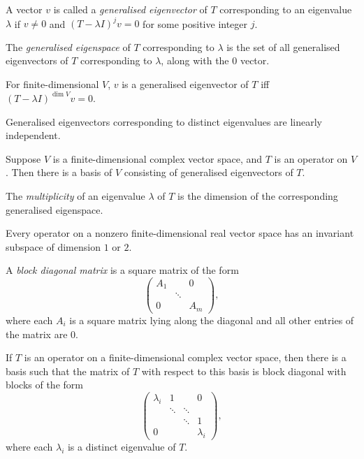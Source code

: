 \begin{defn}
  A vector $v$ is called a \emph{generalised eigenvector} of $T$ corresponding
  to an eigenvalue $\lambda$ if $v\ne 0$ and $(T-\lambda I)^j v=0$ for some
  positive integer $j$.

  The \emph{generalised eigenspace} of $T$ corresponding to $\lambda$ is the set
  of all generalised eigenvectors of $T$ corresponding to $\lambda$, along with
  the $0$ vector.
\end{defn}
\begin{prop}
  For finite-dimensional $V$, 
  $v$ is a generalised eigenvector of $T$ iff $(T-\lambda I)^{\dim V}v=0$.
\end{prop}
\begin{prop}
  Generalised eigenvectors corresponding to distinct eigenvalues are linearly
  independent.
\end{prop}
\begin{prop}
  Suppose $V$ is a finite-dimensional complex vector space, and $T$ is an
  operator on $V$. Then there is a basis of $V$ consisting of generalised
  eigenvectors of $T$.
\end{prop}
\begin{defn}
  The \emph{multiplicity} of an eigenvalue $\lambda$ of $T$ is the dimension of
  the corresponding generalised eigenspace.
\end{defn}
\begin{prop}
  Every operator on a nonzero finite-dimensional real vector space has an invariant
  subspace of dimension $1$ or $2$.
\end{prop}
\begin{defn}
  A \emph{block diagonal matrix} is a square matrix of the form
  \[\begin{pmatrix} A_1&&0 \\ &\ddots& \\0&&A_m \end{pmatrix},\]
  where each $A_i$ is a square matrix lying along the diagonal and all other
  entries of the matrix are $0$.
\end{defn}
\begin{thm}
  If $T$ is an operator on a finite-dimensional complex vector space, then there is a
  basis such that the matrix of $T$ with respect to this basis is block diagonal
  with blocks of the form
  \[\begin{pmatrix} \lambda_i&1&&0 \\
  &\ddots&\ddots& \\
  &&\ddots&1 \\
  0&&&\lambda_i\end{pmatrix},\]
  where each $\lambda_i$ is a distinct eigenvalue of $T$.
\end{thm}
